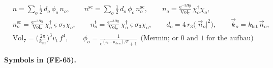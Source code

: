 \documentclass[
  10pt,
]{article}
\begin{document}
\[
\begin{aligned}
&n = \sum_o\tfrac12\,d_o\,\phi_o\,n_o,\qquad n^{\mathrm{sc}} =
 \sum_o\tfrac12\,d_o\,\phi_o\,n^{\mathrm{sc}}_o,\qquad
 n_o = \frac{\mathrm{e}^{-3Hy}}{\mathrm{Vol}_7}\,\chi_o^\dagger\chi_o,\\
&n^{\mathrm{sc}}_o = \frac{\mathrm{e}^{-3Hy}}{\mathrm{Vol}_7}\,\chi_o^\dagger\varsigma\sigma_2\chi_o,\qquad
 n^{\mathrm{t}}_o = \frac{\mathrm{e}^{-3Hy}}{\mathrm{Vol}_7}\,\chi_o^\dagger\varsigma\sigma_3\chi_o,\qquad
 d_o = 4\,r_3\big(\lvert\vec n_o\rvert^2\big),\qquad \vec k_o = k_{\mathrm{lat}}\,\vec n_o,\\
&\mathrm{Vol}_7 = \Big(\frac{2\pi}{k_{\mathrm{lat}}}\Big)^3v_{\mathrm{t}}\,f^4,\qquad
 \phi_o = \frac{1}{\mathrm{e}^{(\varepsilon_o - \mu_{\mathrm{chem}})/T} + 1}\ \ \text{(Mermin; or 0 and
 1 for the aufbau)}
\end{aligned} \tag{FE-65}
\]

\textbf{Symbols in (FE-65).}
\end{document}
